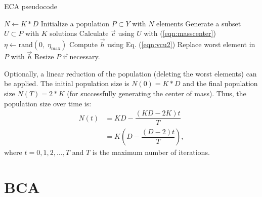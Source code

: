 \documentclass[conference]{IEEEtran}
\begin{document}
\begin{algorithm}[!h]
    \caption{ECA pseudocode}
    \label{algoritmoEca}
    \begin{algorithmic}[1]
        \STATE $N \gets K*D$
        \STATE Initialize a population $P \subset Y$ with $N$ elements
                \STATE Generate a subset $U \subset P$ with $K$ solutions
                \STATE Calculate $\vec{c}$ using $U$ with (\ref{eqn:masscenter})
                \STATE $\eta \gets \text{rand}(0,\; \eta_{\max}) $ 
                \STATE Compute $\vec{h}$ using Eq. (\ref{eqn:vcu2})
                    \STATE Replace worst element in $P$ with $\vec{h}$
                \ENDIF
            \ENDFOR
            \STATE Resize $P$ if necessary.
        \ENDWHILE
    \end{algorithmic}
\end{algorithm}

Optionally, a linear reduction of the population (deleting the worst elements) can
be applied. The initial population size is $ N(0) = K*D$ and the final population
size $N(T) =  2*K$ (for successfully generating the center of mass). Thus, the
population size over time is:
\begin{align}
    N(t) &= KD - \dfrac{(KD - 2K)  t}{T} \\ \nonumber
         &= K \left( D - \dfrac{(D - 2)  t}{T} \right),
\end{align}
% 
where $t = 0,1,2,\ldots,T$ and $T$ is the maximum number of iterations.



\section{BCA} %
\label{sec:bca}
\end{document}
